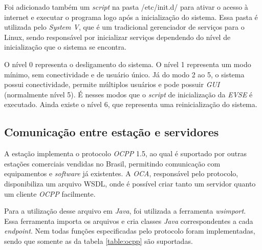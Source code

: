       Foi adicionado também um \textit{script} na pasta /etc/init.d/ para ativar o acesso à internet e executar o programa logo após a inicialização do sistema. Essa pasta é utilizada pelo \textit{System V}, que é um tradicional gerenciador de serviços para o Linux, sendo responsável por inicializar serviços dependendo do nível de inicialização que o sistema se encontra.

      O nível 0 representa o desligamento do sistema. O nível 1 representa um modo mínimo, sem conectividade e de usuário único. Já do modo 2 ao 5, o sistema possui conectividade, permite múltiplos usuários e pode possuir \textit{\ac{GUI}} (normalmente nível 5). É nesses modos que o \textit{script} de inicialização da \textit{\ac{EVSE}} é executado. Ainda existe o nível 6, que representa uma reinicialização do sistema.

    \subsection{Comunicação entre estação e servidores}
    \label{methodology:structure:ocpp}

      A estação implementa o protocolo \textit{\ac{OCPP}} 1.5, ao qual é suportado por outras estações comerciais vendidas no Brasil, permitindo comunicação com equipamentos e \textit{software} já existentes. A \textit{\ac{OCA}}, responsável pelo protocolo, disponibiliza um arquivo WSDL, onde é possível criar tanto um servidor quanto um cliente \textit{\ac{OCPP}} facilmente.

      Para a utilização desse arquivo em \textit{Java}, foi utilizada a ferramenta \textit{wsimport}. Essa ferramenta importa os arquivos e cria classes \textit{Java} correspondentes a cada \textit{endpoint}. Nem todas funções especificadas pelo protocolo foram implementadas, sendo que somente as da tabela \ref{table:ocpp} são suportadas.

